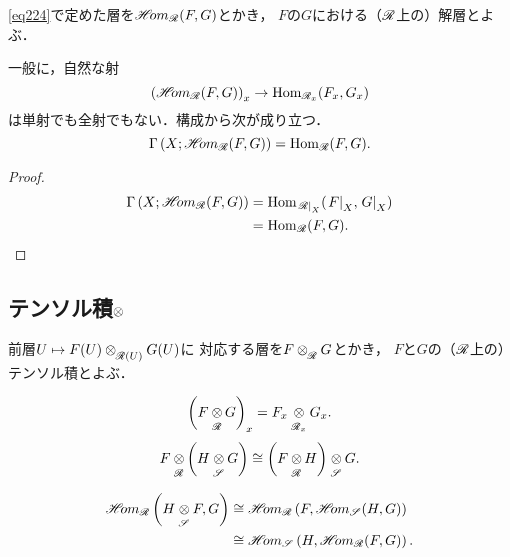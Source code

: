 \begin{DFN}
    \eqref{eq224}で定めた層を\(\HOM_{\scR}(F,G)\)とかき，
    \(F\)の\(G\)における（\(\scR\)上の）解層とよぶ．
\end{DFN}

一般に，自然な射
\begin{equation}
    \left(\HOM_{\scR}(F,G)\right)_{x}
    \to
    \Hom_{\scR_{x}}(F_{x},G_{x})
\end{equation}
は単射でも全射でもない．構成から次が成り立つ．
\begin{equation}
    \Gamma\left(X;\HOM_{\scR}(F,G)\right)
    =\Hom_{\scR}(F,G).
\end{equation}
\begin{proof}
    \begin{align*}
        \Gamma\left(X;\HOM_{\scR}(F,G)\right)
        &=\Hom_{\mres[\scR]{X}}(\mres[F]{X},\mres[G]{X})\\    
        &=\Hom_{\scR}(F,G).    
    \end{align*}        
\end{proof}

\subsection*{テンソル積\(\ttens\)}
\begin{DFN}
    前層\(U\mapsto F(U)\ttens[\scR(U)]G(U)\)に
    対応する層を\(F\ttens[\scR]G\)とかき，
    \(F\)と\(G\)の（\(\scR\)上の）テンソル積とよぶ．
\end{DFN}

\begin{equation}
    \left(F\ttens[\scR]G\right)_x
    =F_x\ttens[\scR_x]G_x.
\end{equation}
\begin{equation}
    F\ttens[\scR]\left(H\ttens[\scS]G\right)
    \cong
    \left(F\ttens[\scR]H\right)\ttens[\scS]G.
\end{equation}

\begin{PRP}\label{prp229}
    \begin{align}
        \HOM_{\scR}\left(H\ttens[\scS]F,G\right)
        &\cong
        \HOM_{\scR}\left(F,\HOM_{\scS}(H,G)\right)\label{eq229}\\
        &\cong
        \HOM_{\scS}\left(H,\HOM_{\scR}(F,G)\right).\notag
    \end{align}
\end{PRP}

